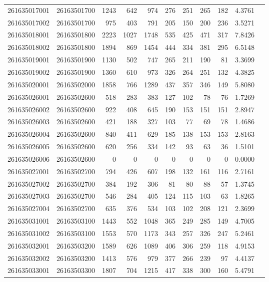 \documentclass[11pt,landscape]{article}
\begin{document}
{\begin{longtable}[]{@{}lrrrrrrrrrr@{}}
261635017001 & 26163501700 & 1243 & 642 & 974 & 276 & 251 & 265 & 182 & 4.3761 \\
261635017002 & 26163501700 & 975 & 403 & 791 & 205 & 150 & 200 & 236 & 3.5271 \\
261635018001 & 26163501800 & 2223 & 1027 & 1748 & 535 & 425 & 471 & 317 & 7.8426 \\
261635018002 & 26163501800 & 1894 & 869 & 1454 & 444 & 334 & 381 & 295 & 6.5148 \\
261635019001 & 26163501900 & 1130 & 502 & 747 & 265 & 211 & 190 & 81 & 3.3699 \\
261635019002 & 26163501900 & 1360 & 610 & 973 & 326 & 264 & 251 & 132 & 4.3825 \\
261635020001 & 26163502000 & 1858 & 766 & 1289 & 437 & 357 & 346 & 149 & 5.8080 \\
261635026001 & 26163502600 & 518 & 283 & 383 & 127 & 102 & 78 & 76 & 1.7269 \\
261635026002 & 26163502600 & 922 & 408 & 645 & 190 & 153 & 151 & 151 & 2.8947 \\
261635026003 & 26163502600 & 421 & 188 & 327 & 103 & 77 & 69 & 78 & 1.4686 \\
261635026004 & 26163502600 & 840 & 411 & 629 & 185 & 138 & 153 & 153 & 2.8163 \\
261635026005 & 26163502600 & 620 & 256 & 334 & 142 & 93 & 63 & 36 & 1.5101 \\
261635026006 & 26163502600 & 0 & 0 & 0 & 0 & 0 & 0 & 0 & 0.0000 \\
261635027001 & 26163502700 & 794 & 426 & 607 & 198 & 132 & 161 & 116 & 2.7161 \\
261635027002 & 26163502700 & 384 & 192 & 306 & 81 & 80 & 88 & 57 & 1.3745 \\
261635027003 & 26163502700 & 546 & 284 & 405 & 124 & 115 & 103 & 63 & 1.8265 \\
261635027004 & 26163502700 & 635 & 376 & 534 & 103 & 102 & 208 & 121 & 2.3699 \\
261635031001 & 26163503100 & 1443 & 552 & 1048 & 365 & 249 & 285 & 149 & 4.7005 \\
261635031002 & 26163503100 & 1553 & 570 & 1173 & 343 & 257 & 326 & 247 & 5.2461 \\
261635032001 & 26163503200 & 1589 & 626 & 1089 & 406 & 306 & 259 & 118 & 4.9153 \\
261635032002 & 26163503200 & 1413 & 576 & 979 & 377 & 266 & 239 & 97 & 4.4137 \\
261635033001 & 26163503300 & 1807 & 704 & 1215 & 417 & 338 & 300 & 160 & 5.4791 \\

\end{longtable}}
\end{document}
